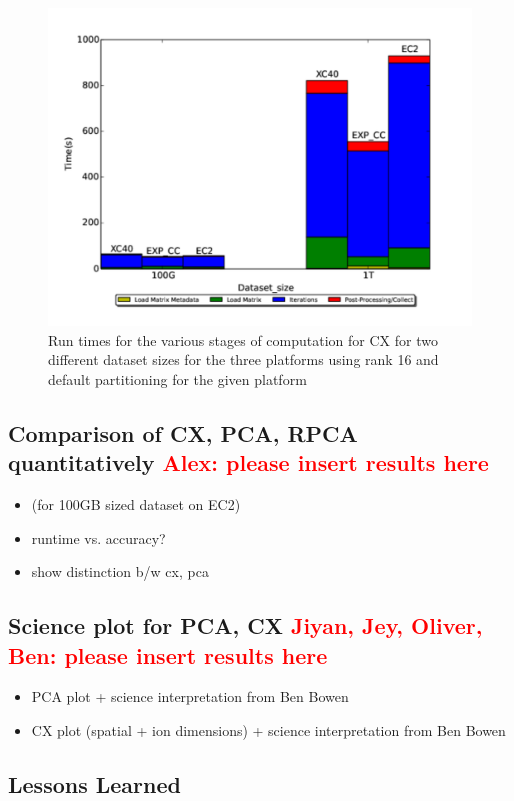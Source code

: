     \begin{figure} [H]
    \begin{centering}
    \includegraphics[scale=0.4]{images/CX_Size_Scaling_Rank_16_Partitions_default.pdf}
    \end{centering}
    \caption{ Run times for the various stages of computation for CX for two different dataset sizes for the three platforms using rank 16 and default partitioning for the given platform} 
    \label{fig:h2hrank16} 
    \end{figure}

    
  

  

  \subsection{Comparison of CX, PCA, RPCA quantitatively \textcolor{red}{Alex: please insert results here} }
    \begin{itemize}
      \item (for 100GB sized dataset on EC2)
      \item runtime vs. accuracy?
      \item show distinction b/w cx, pca
    \end{itemize}

  \subsection{Science plot for PCA, CX \textcolor{red}{Jiyan, Jey, Oliver, Ben: please insert results here}}
    \begin{itemize}
      \item PCA plot + science interpretation from Ben Bowen
      \item CX plot (spatial + ion dimensions) + science interpretation from Ben Bowen
    \end{itemize}

  \subsection{Lessons Learned}
  \label{sect:lessons}
  
  

